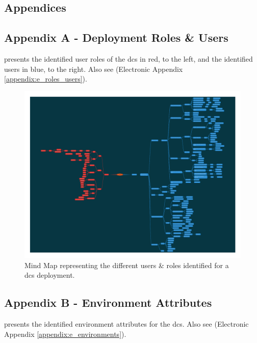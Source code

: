 \begin{appendices}

\chapter{Appendices}
\label{ch:appendices}

\section{Appendix A - Deployment Roles \& Users}
\label{appendix:roles_users}

 presents the identified user roles of the \acrfull{dcs} in red, to the left, and the identified users in blue, to the right. Also see (Electronic Appendix \ref{appendix:e_roles_users}).

\begin{figure}[htp]
    \centering
    \label{fig:appendix_roles_users}
    \includegraphics[width=\linewidth]{appendices/mind_maps/ABE_Users_slides_Oct26.pdf}
    \caption{Mind Map representing the different users \& roles identified for a \acrshort{dcs} deployment.}
\end{figure}

\section{Appendix B - Environment Attributes}
\label{appendix:environments}

 presents the identified environment attributes for the \acrfull{dcs}. Also see (Electronic Appendix \ref{appendix:e_environments}).


\end{appendices}
